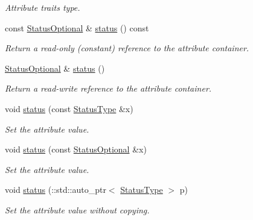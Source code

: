 \begin{DoxyCompactItemize}
\begin{DoxyCompactList}\small\item\em Attribute traits type. \item\end{DoxyCompactList}\item 
const \hyperlink{classopenstack_1_1xml_1_1Image_ad54f9fe9aff91875b983bbc19e332b55}{StatusOptional} \& \hyperlink{classopenstack_1_1xml_1_1Image_a6a8b692e15329dcca1cf1b07323e1b3e}{status} () const 
\begin{DoxyCompactList}\small\item\em Return a read-\/only (constant) reference to the attribute container. \item\end{DoxyCompactList}\item 
\hyperlink{classopenstack_1_1xml_1_1Image_ad54f9fe9aff91875b983bbc19e332b55}{StatusOptional} \& \hyperlink{classopenstack_1_1xml_1_1Image_a12c030cde453c1a0b6b7c2f2fac407fb}{status} ()
\begin{DoxyCompactList}\small\item\em Return a read-\/write reference to the attribute container. \item\end{DoxyCompactList}\item 
void \hyperlink{classopenstack_1_1xml_1_1Image_a826e69ac8469286ab776c75fd1f3a8d0}{status} (const \hyperlink{classopenstack_1_1xml_1_1ImageStatus}{StatusType} \&x)
\begin{DoxyCompactList}\small\item\em Set the attribute value. \item\end{DoxyCompactList}\item 
void \hyperlink{classopenstack_1_1xml_1_1Image_a64c4dd2da7d5156449c4e9b5831ee6c8}{status} (const \hyperlink{classopenstack_1_1xml_1_1Image_ad54f9fe9aff91875b983bbc19e332b55}{StatusOptional} \&x)
\begin{DoxyCompactList}\small\item\em Set the attribute value. \item\end{DoxyCompactList}\item 
void \hyperlink{classopenstack_1_1xml_1_1Image_a017288e75655678fe8d9ed7cd9bd3e62}{status} (::std::auto\_\-ptr$<$ \hyperlink{classopenstack_1_1xml_1_1ImageStatus}{StatusType} $>$ p)
\begin{DoxyCompactList}\small\item\em Set the attribute value without copying. \item\end{DoxyCompactList}\end{DoxyCompactItemize}

